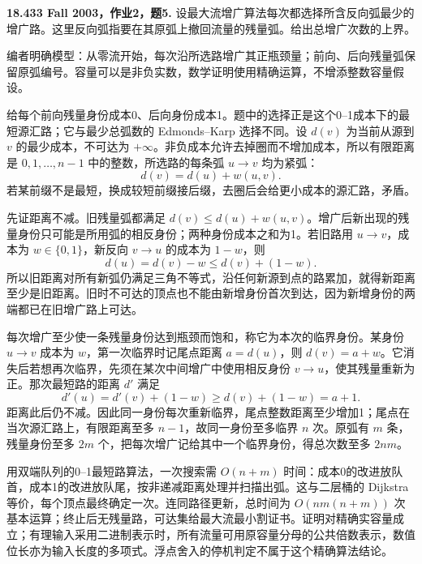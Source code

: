 \begin{exercise}\label{mit:18433-a2-q5}
\textbf{18.433 Fall 2003，作业2，题5.}
设最大流增广算法每次都选择所含反向弧最少的增广路。这里反向弧指要在其原弧上撤回流量的残量弧。给出总增广次数的上界。

编者明确模型：从零流开始，每次沿所选路增广其正瓶颈量；前向、后向残量弧保留原弧编号。容量可以是非负实数，数学证明使用精确运算，不增添整数容量假设。
\end{exercise}
\begin{solution}
给每个前向残量身份成本0、后向身份成本1。题中的选择正是这个0--1成本下的最短源汇路；它与最少总弧数的 Edmonds--Karp 选择不同。设 $d(v)$ 为当前从源到 $v$ 的最少成本，不可达为 $+\infty$。非负成本允许去掉圈而不增加成本，所以有限距离是 $0,1,\ldots,n-1$ 中的整数，所选路的每条弧 $u\to v$ 均为紧弧：
\[
 d(v)=d(u)+w(u,v).
\]
若某前缀不是最短，换成较短前缀接后缀，去圈后会给更小成本的源汇路，矛盾。

先证距离不减。旧残量弧都满足 $d(v)\le d(u)+w(u,v)$。增广后新出现的残量身份只可能是所用弧的相反身份；两种身份成本之和为1。若旧路用 $u\to v$，成本为 $w\in\{0,1\}$，新反向 $v\to u$ 的成本为 $1-w$，则
\[
 d(u)=d(v)-w\le d(v)+(1-w).
\]
所以旧距离对所有新弧仍满足三角不等式，沿任何新源到点的路累加，就得新距离至少是旧距离。旧时不可达的顶点也不能由新增身份首次到达，因为新增身份的两端都已在旧增广路上可达。

每次增广至少使一条残量身份达到瓶颈而饱和，称它为本次的临界身份。某身份 $u\to v$ 成本为 $w$，第一次临界时记尾点距离 $a=d(u)$，则 $d(v)=a+w$。它消失后若想再次临界，先须在某次中间增广中使用相反身份 $v\to u$，使其残量重新为正。那次最短路的距离 $d'$ 满足
\[
 d'(u)=d'(v)+(1-w)\ge d(v)+(1-w)=a+1.
\]
距离此后仍不减。因此同一身份每次重新临界，尾点整数距离至少增加1；尾点在当次源汇路上，有限距离至多 $n-1$，故同一身份至多临界 $n$ 次。原弧有 $m$ 条，残量身份至多 $2m$ 个，把每次增广记给其中一个临界身份，得总次数至多 $2nm$。

用双端队列的0--1最短路算法，一次搜索需 $O(n+m)$ 时间：成本0的改进放队首，成本1的改进放队尾，按非递减距离处理并扫描出弧。这与二层桶的 Dijkstra 等价，每个顶点最终确定一次。连同路径更新，总时间为 $O(nm(n+m))$ 次基本运算；终止后无残量路，可达集给最大流最小割证书。证明对精确实容量成立；有理输入采用二进制表示时，所有流量可用原容量分母的公共倍数表示，数值位长亦为输入长度的多项式。浮点舍入的停机判定不属于这个精确算法结论。
\end{solution}

